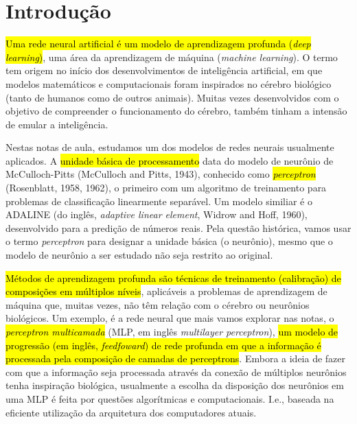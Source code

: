 

\chapter{Introdução}\label{cap_intro}
\thispagestyle{fancy}

\hl{Uma rede neural artificial é um modelo de aprendizagem profunda (\emph{deep learning})}, uma área da aprendizagem de máquina (\emph{machine learning}). O termo tem origem no início dos desenvolvimentos de inteligência artificial, em que modelos matemáticos e computacionais foram inspirados no cérebro biológico (tanto de humanos como de outros animais). Muitas vezes desenvolvidos com o objetivo de compreender o funcionamento do cérebro, também tinham a intensão de emular a inteligência.

Nestas notas de aula, estudamos um dos modelos de redes neurais usualmente aplicados. A \hl{unidade básica de processamento} data do modelo de neurônio de McCulloch-Pitts (McCulloch and Pitts, 1943), conhecido como \hl{\emph{perceptron}} (Rosenblatt, 1958, 1962), o primeiro com um algoritmo de treinamento para problemas de classificação linearmente separável. Um modelo similiar é o ADALINE (do inglês, {\it adaptive linear element}, Widrow and Hoff, 1960), desenvolvido para a predição de números reais. Pela questão histórica, vamos usar o termo \emph{perceptron} para designar a unidade básica (o neurônio), mesmo que o modelo de neurônio a ser estudado não seja restrito ao original.

\hl{Métodos de aprendizagem profunda são técnicas de treinamento (calibração) de composições em múltiplos níveis}, aplicáveis a problemas de aprendizagem de máquina que, muitas vezes, não têm relação com o cérebro ou neurônios biológicos. Um exemplo, é a rede neural que mais vamos explorar nas notas, o \hl{\emph{perceptron multicamada}} (MLP, em inglês \textit{multilayer perceptron}), \hl{um modelo de progressão (em inglês, \textit{feedfoward}) de rede profunda em que a informação é processada pela composição de camadas de perceptrons}. Embora a ideia de fazer com que a informação seja processada através da conexão de múltiplos neurônios tenha inspiração biológica, usualmente a escolha da disposição dos neurônios em uma MLP é feita por questões algorítmicas e computacionais. I.e., baseada na eficiente utilização da arquitetura dos computadores atuais.

